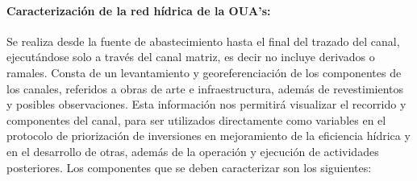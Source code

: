\documentclass[]{article}
\begin{document}
\paragraph{Caracterización de la red hídrica de la OUA's:}
Se realiza desde la fuente de abastecimiento hasta el final del trazado del canal, ejecutándose solo a través del canal matriz, es decir no incluye derivados o ramales. Consta de un levantamiento y georeferenciación de los componentes de los canales, referidos a obras de arte e infraestructura, además de revestimientos y posibles observaciones. Esta información nos permitirá visualizar el recorrido y componentes del canal, para ser utilizados directamente como variables en el protocolo de priorización de inversiones en mejoramiento de la eficiencia hídrica y en el desarrollo de otras, además de la operación y ejecución de actividades posteriores. Los componentes que se deben caracterizar son los siguientes:
\end{document}
